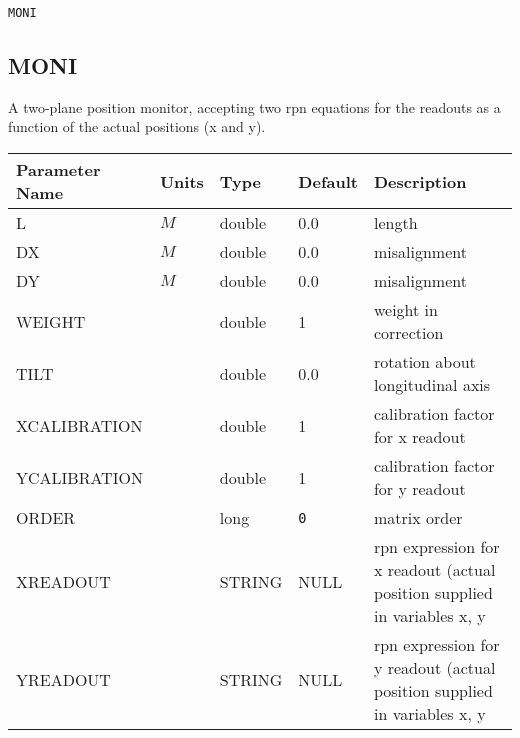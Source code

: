 \begin{latexonly}
\newpage
\begin{center}{\Large\verb|MONI|}\end{center}
\end{latexonly}\subsection{MONI}
A two-plane position monitor, accepting two rpn equations for the readouts
as a function of the actual positions (x and y).
\\
\begin{tabular}{|l|l|l|l|p{\descwidth}|} \hline
Parameter Name & Units & Type & Default & Description \\ \hline 
L & $M$ & double &  0.0 & length  \\ \hline 
DX & $M$ & double &  0.0 & misalignment  \\ \hline 
DY & $M$ & double &  0.0 & misalignment  \\ \hline 
WEIGHT &  & double &   1 & weight in correction  \\ \hline 
TILT &  & double &  0.0 & rotation about longitudinal axis  \\ \hline 
XCALIBRATION &  & double &   1 & calibration factor for x readout  \\ \hline 
YCALIBRATION &  & double &   1 & calibration factor for y readout  \\ \hline 
ORDER &  & long &  \verb|0| & matrix order  \\ \hline 
XREADOUT &  & STRING &   NULL            & rpn expression for x readout (actual position supplied in variables x, y  \\ \hline 
YREADOUT &  & STRING &   NULL            & rpn expression for y readout (actual position supplied in variables x, y  \\ \hline 
\end{tabular}

